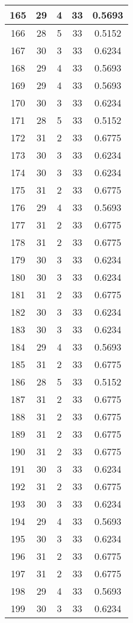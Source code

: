 \documentclass[letterpaper, 12pt]{article}
\begin{document}
\begin{longtable}{|c|c|c|c|c|}
\hline
165 & 29 & 4 & 33 & 0.5693 \\
\hline
166 & 28 & 5 & 33 & 0.5152 \\
\hline
167 & 30 & 3 & 33 & 0.6234 \\
\hline
168 & 29 & 4 & 33 & 0.5693 \\
\hline
169 & 29 & 4 & 33 & 0.5693 \\
\hline
170 & 30 & 3 & 33 & 0.6234 \\
\hline
171 & 28 & 5 & 33 & 0.5152 \\
\hline
172 & 31 & 2 & 33 & 0.6775 \\
\hline
173 & 30 & 3 & 33 & 0.6234 \\
\hline
174 & 30 & 3 & 33 & 0.6234 \\
\hline
175 & 31 & 2 & 33 & 0.6775 \\
\hline
176 & 29 & 4 & 33 & 0.5693 \\
\hline
177 & 31 & 2 & 33 & 0.6775 \\
\hline
178 & 31 & 2 & 33 & 0.6775 \\
\hline
179 & 30 & 3 & 33 & 0.6234 \\
\hline
180 & 30 & 3 & 33 & 0.6234 \\
\hline
181 & 31 & 2 & 33 & 0.6775 \\
\hline
182 & 30 & 3 & 33 & 0.6234 \\
\hline
183 & 30 & 3 & 33 & 0.6234 \\
\hline
184 & 29 & 4 & 33 & 0.5693 \\
\hline
185 & 31 & 2 & 33 & 0.6775 \\
\hline
186 & 28 & 5 & 33 & 0.5152 \\
\hline
187 & 31 & 2 & 33 & 0.6775 \\
\hline
188 & 31 & 2 & 33 & 0.6775 \\
\hline
189 & 31 & 2 & 33 & 0.6775 \\
\hline
190 & 31 & 2 & 33 & 0.6775 \\
\hline
191 & 30 & 3 & 33 & 0.6234 \\
\hline
192 & 31 & 2 & 33 & 0.6775 \\
\hline
193 & 30 & 3 & 33 & 0.6234 \\
\hline
194 & 29 & 4 & 33 & 0.5693 \\
\hline
195 & 30 & 3 & 33 & 0.6234 \\
\hline
196 & 31 & 2 & 33 & 0.6775 \\
\hline
197 & 31 & 2 & 33 & 0.6775 \\
\hline
198 & 29 & 4 & 33 & 0.5693 \\
\hline
199 & 30 & 3 & 33 & 0.6234 \\
\hline
\end{longtable}
\end{document}
